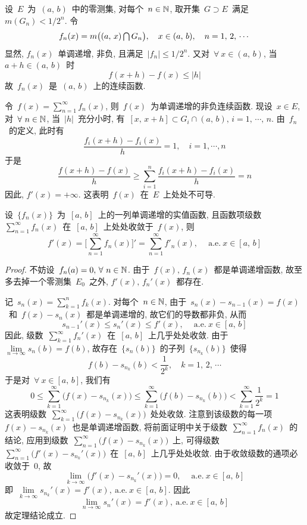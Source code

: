 \begin{example}
设~$E$~为~$(a,\,b)$~中的零测集, 对每个~$n \in \mathbb{N}$, 取开集~$G \supset E$~满足~$m(G_n) < 1/2^n$. 令
\[
f_n(x) = m\big( (a,\,x) \mathop{\textstyle{\bigcap}} G_n \big), \quad x \in (a,\,b), \quad n = 1,\,2,\,\cdots
\]
显然, $f_n(x)$~单调递增, 非负, 且满足~$|f_n| \leqslant 1/2^n$. 又对~$\forall~x \in (a,\,b)$, 当~$a+h \in (a,\,b)$~时
\[
f(x+h) - f(x) \leqslant |h|
\]
故~$f_n(x)$~是~$(a,\,b)$~上的连续函数.

令~$f(x) = \sum\limits_{n=1}^\infty f_n(x)$, 则~$f(x)$~为单调递增的非负连续函数. 现设~$x \in E$, 对~$\forall~n \in \mathbb{N}$, 当~$|h|$~充分小时, 有~$[x,\,x+h] \subset G_i \cap (a,\,b), \, i=1,\,\cdots,\,n$.
由~$f_n$~的定义, 此时有
\[
\frac{f_i(x+h)-f_i(x)}{h} = 1, \quad i=1,\cdots,n
\]
于是
\[
\frac{f(x+h)-f(x)}{h} \geqslant \sum_{i=1}^n \frac{f_i(x+h)-f_i(x)}{h} = n
\]
因此, $f'(x) = +\infty$. 这表明~$f(x)$~在~$E$~上处处不可导.
\end{example}

\begin{theorem} \label{thm514}
设~$\{f_n(x)\}$~为~$[a,\,b]$~上的一列单调递增的实值函数, 且函数项级数~$\sum\limits_{n=1}^\infty f_n(x)$~在~$[a,\,b]$~上处处收敛于~$f(x)$, 则
\[
f'(x) = \Big[\sum\limits_{n=1}^\infty f_n(x)\Big]' = \sum\limits_{n=1}^\infty f'_n(x), \quad \mathrm{~a.e.~} x \in [a,\,b]
\]
\end{theorem}

\begin{proof}
不妨设~$f_n(a) =0, \, \forall~n \in \mathbb{N}$. 由于~$f(x),\,f_n(x)$~都是单调递增函数, 故至多去掉一个零测集~$E_0$~之外, $f'(x),\,f_n'(x)$~都存在.

记~$s_n(x) = \sum\limits_{k=1}^n f_k(x)$. 对每个~$n \in \mathbb{N}$, 由于~$s_n(x) - s_{n-1}(x) = f(x)$~和~$f(x) - s_n(x)$~都是单调递增的, 故它们的导数都非负, 从而
\[
s_{n-1}'(x) \leqslant s_n'(x) \leqslant f'(x), \quad \mathrm{~a.e.~ }x \in [a,\,b]
\]
因此, 级数~$\sum\limits_{k=1}^\infty f_n'(x)$~在~$[a,\,b]$~上几乎处处收敛. 由于~$\lim\limits_{n \to \infty} s_n(b) = f(b)$, 故存在~$\{s_n(b)\}$~的子列~$\{s_{n_k}(b)\}$~使得
\[
f(b) - s_{n_k}(b) < \frac{1}{2^k}, \quad k = 1,\,2,\,\cdots
\]
于是对~$\forall~x \in [a,\,b]$, 我们有
\[
0 \leqslant \sum_{k=1}^\infty \big( f(x) - s_{n_k}(x) \big) \leqslant \sum_{k=1}^\infty \big( f(b) - s_{n_k}(b) \big) < \sum_{k=1}^\infty \frac{1}{2^k} = 1
\]
这表明级数~$\sum\limits_{k=1}^\infty \big( f(x) - s_{n_k}(x) \big)$~处处收敛. 注意到该级数的每一项~$f(x) - s_{n_k}(x)$~也是单调递增函数, 将前面证明中关于级数~$\sum\limits_{n=1}^\infty f_n(x)$~的结论, 应用到级数~$\sum\limits_{n=1}^\infty \big( f(x) - s_{n_k}(x) \big)$~上, 可得级数~$\sum\limits_{n=1}^\infty \big( f'(x) - s_{n_k}'(x) \big)$~在~$[a,\,b]$~上几乎处处收敛. 由于收敛级数的通项必收敛于~$0$, 故
\[
\lim_{k \to \infty} \big( f'(x) - s_{n_k}'(x) \big) =0, \quad \mathrm{~a.e.~ }x \in [a,\,b]
\]
即~$\lim\limits_{k \to \infty} s_{n_k}'(x) = f'(x), \mathrm{~a.e.~ }x \in [a,\,b]$. 因此
\[
\lim\limits_{n \to \infty} s_n'(x) = f'(x), \mathrm{~a.e.~ }x \in [a,\,b]
\]
故定理结论成立.
\end{proof}

